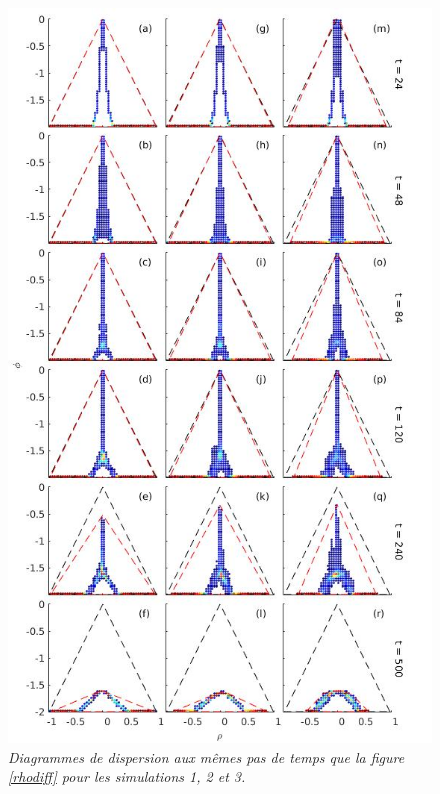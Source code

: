 \documentclass[a4paper,12pt]{article}
\begin{document}
    \begin{figure}[!h]
        \centering
        \includegraphics[width=0.6\linewidth]{figures/scatterplot_rhodiff.jpg}
        \caption{\textit{Diagrammes de dispersion aux mêmes pas de temps que la figure \ref{rhodiff} pour les simulations 1, 2 et 3.}}
        \label{scatterplot_rho}
    \end{figure}
    
\end{document}
